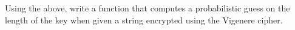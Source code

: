   Using the above, write a function that
  computes a probabilistic guess on the
  length of the key when given a string encrypted using
  the Vigenere cipher.
